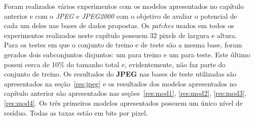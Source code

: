 Foram realizados vários experimentos com os modelos apresentados no capítulo anterior e com o \textit{JPEG} e \textit{JPEG2000} com o objetivo de avaliar o potencial de cada um deles nas bases de dados propostas. Os \textit{patches} usados em todos os experimentos realizados neste capítulo possuem 32 pixels de largura e altura. Para os testes em que o conjunto de treino e de teste são a mesma base, foram gerados dois subconjuntos disjuntos: um para treino e um para teste. Este último possui cerca de 10\% do tamanho total e, evidentemente, não faz parte do conjunto de treino. Os resultados do \textbf{JPEG} nas bases de teste utilizadas são apresentados na seção~\ref{res:jpeg} e os resultados dos modelos apresentados no capítulo anterior são apresentados nas seções~\ref{res:mod1}, \ref{res:mod2}, \ref{res:mod3}, \ref{res:mod4}. Os três primeiros modelos apresentados possuem um único nível de resíduo. Todas as taxas estão em bits por pixel.
